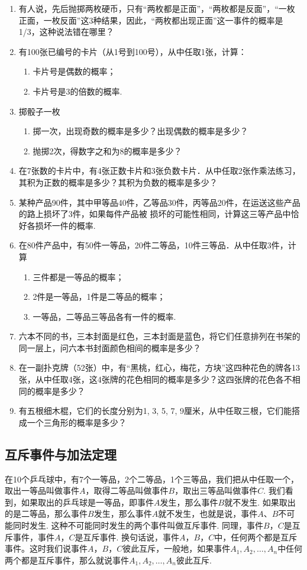 \begin{ex}
\begin{enumerate}
\item 有人说，先后抛掷两枚硬币，只有“两枚都是正面”，“两枚都是反面”，“一枚正面，一枚反面”这3种结果，因此，“两枚都出现正面”这一事件的概率是1/3，这种说法错在哪里？
\item 有100张已编号的卡片（从1号到100号），从中任取1张，计算：
\begin{enumerate}[(1)]
    \item 卡片号是偶数的概率；    \item 卡片号是3的倍数的概率.
\end{enumerate}
\item 掷骰子一枚
\begin{enumerate}[(1)]
\item 掷一次，出现奇数的概率是多少？出现偶数的概率是多少？
\item 抛掷2次，得数字之和为8的概率是多少？
\end{enumerate}
\item 在7张数的卡片中，有4张正数卡片和3张负数卡片．从中任取2张作乘法练习，其积为正数的概率是多少？其积为负数的概率是多少？
\item 某种产品90件，其中甲等品40件，乙等品30件，丙等品20件，在运送这些产品的路上损坏了3件，如果每件产品被
损坏的可能性相同，计算这三等产品中恰好各损坏一件的概率.
\item 在80件产品中，有50件一等品，20件二等品，10件三等品．从中任取3件，计算
\begin{enumerate}[(1)]
\item 三件都是一等品的概率；    \item 2件是一等品，1件是二等品的概率；    \item 一等品，二等品三等品各有一件的概率.
\end{enumerate}

\item 六本不同的书，三本封面是红色，三本封面是蓝色，将它们任意排列在书架的同一层上，问六本书封面颜色相间的概率是多少？
\item 在一副扑克牌（52张）中，有“黑桃，红心，梅花，方块”这四种花色的牌各13张，从中任取4张，这4张牌的花色相同的概率是多少？这四张牌的花色各不相同的概率是多少？
\item 有五根细木棍，它们的长度分别为1, 3, 5, 7, 9厘米，从中任取三根，它们能搭成一个三角形的概率是多少？
\end{enumerate}
\end{ex}

\subsection{互斥事件与加法定理}
在10个乒乓球中，有7个一等品，2个二等品，1个三等品，我们把从中任取一个，取出一等品叫做事件$A$，取得二等品叫做事件$B$，取出三等品叫做事件$C$. 我们看到，如果取出的乒乓球是一等品，即事件$A$发生，那么事件$B$就不发生. 如果取出的是二等品，那么事件$B$发生，那么事件$A$就不发生，也就是说，事件$A$、$B$不可能同时发生. 这种不可能同时发生的两个事件叫做互斥事件. 同理，事件$B$，$C$是互斥事件，事件$A$，$C$是互斥事件. 换句话说，事件$A$，$B$，$C$中，任何两个都是互斥事件。这时我们说事件$A$，$B$，$C$彼此互斥，一般地，如果事件$A_1,A_2,\ldots,A_n$中任何两个都是互斥事件，那么就说事件$A_1,A_2,\ldots,A_n$彼此互斥.

